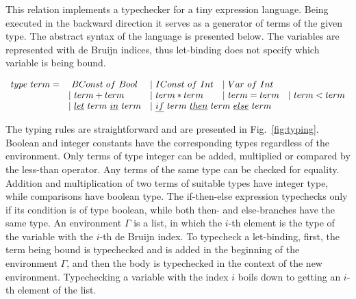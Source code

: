 This relation implements a typechecker for a tiny expression language.
Being executed in the backward direction it serves as a generator of terms of the given type.
The abstract syntax of the language is presented below.
The variables are represented with de Bruijn indices, thus let-binding does not specify which variable is being bound.

\[\begin{array}{lllll}
  type \ term = &\ BConst \ of \ Bool &| \ IConst \ of \ Int &| \ Var \ of \ Int & \\
  & | \ term + term &| \ term * term &| \ term = term &| \ term < term \\
  &| \ \underline{let} \ term \ \underline{in} \ term
  &\multicolumn{2}{l}{| \ \underline{if} \ term \ \underline{then} \ term \ \underline{else} \ term} &
\end{array}\]

The typing rules are straightforward and are presented in Fig.~\ref{fig:typing}.
Boolean and integer constants have the corresponding types regardless of the environment.
Only terms of type integer can be added, multiplied or compared by the less-than operator.
Any terms of the same type can be checked for equality.
Addition and multiplication of two terms of suitable types have integer type, while comparisons have boolean type.
The if-then-else expression typechecks only if its condition is of type boolean, while both then- and else-branches have the same type.
An environment $\Gamma$ is a list, in which the $i$-th element is the type of the variable with the $i$-th de Bruijn index.
To typecheck a let-binding, first, the term being bound is typechecked and is added in the beginning of the environment $\Gamma$, and then the body is typechecked in the context of the new environment.
Typechecking a variable with the index $i$ boils down to getting an $i$-th element of the list.

